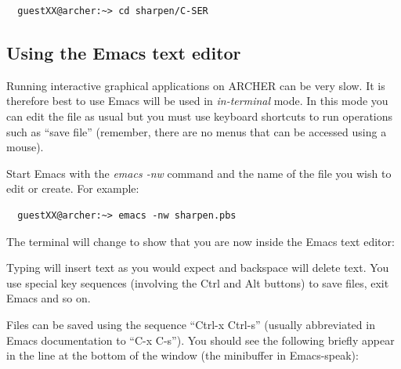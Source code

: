 \documentclass{article}
\begin{document}
\begin{verbatim}
  guestXX@archer:~> cd sharpen/C-SER
\end{verbatim}

\subsection{Using the Emacs text editor}
\label{sec-3-3}


Running interactive graphical applications on ARCHER can be very slow.
It is therefore best to use Emacs will be used in \emph{in-terminal}
mode. In this mode you can edit the file as usual but you must use
keyboard shortcuts to run operations such as ``save file'' (remember,
there are no menus that can be accessed using a mouse).

Start Emacs with the \emph{emacs -nw} command and the name of the file
you wish to edit or create. For example:


\begin{verbatim}
  guestXX@archer:~> emacs -nw sharpen.pbs
\end{verbatim}

The terminal will change to show that you are now inside the Emacs
text editor:

{\centerline{}}

Typing will insert text as you would expect and backspace will delete
text. You use special key sequences (involving the Ctrl and Alt
buttons) to save files, exit Emacs and so on.

Files can be saved using the sequence ``Ctrl-x Ctrl-s'' (usually
abbreviated in Emacs documentation to ``C-x C-s''). You should see the
following briefly appear in the line at the bottom of the window (the
minibuffer in Emacs-speak):
\end{document}
